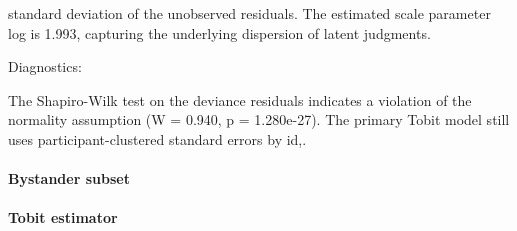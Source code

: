 \documentclass[11pt]{article}
\begin{document}
standard deviation of the unobserved residuals. The estimated scale parameter log is 1.993, capturing the underlying dispersion of latent judgments.

Diagnostics:

The Shapiro-Wilk test on the deviance residuals indicates a violation of the normality assumption (W = 0.940, p = 1.280e-27). The primary Tobit model still uses participant-clustered standard errors by id,.


\paragraph{Bystander subset}

\paragraph{Tobit estimator}
\end{document}
